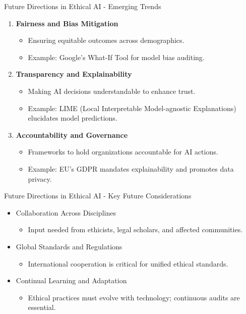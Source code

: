 \documentclass[aspectratio=169]{beamer}
\begin{document}
\begin{frame}[fragile]{Future Directions in Ethical AI - Emerging Trends}
    \begin{enumerate}
        \item \textbf{Fairness and Bias Mitigation}
            \begin{itemize}
                \item Ensuring equitable outcomes across demographics.
                \item Example: Google's What-If Tool for model bias auditing.
            \end{itemize}
        
        \item \textbf{Transparency and Explainability}
            \begin{itemize}
                \item Making AI decisions understandable to enhance trust.
                \item Example: LIME (Local Interpretable Model-agnostic Explanations) elucidates model predictions.
            \end{itemize}
        
        \item \textbf{Accountability and Governance}
            \begin{itemize}
                \item Frameworks to hold organizations accountable for AI actions.
                \item Example: EU's GDPR mandates explainability and promotes data privacy.
            \end{itemize}
    \end{enumerate}
\end{frame}

\begin{frame}[fragile]{Future Directions in Ethical AI - Key Future Considerations}
    \begin{itemize}
        \item Collaboration Across Disciplines
            \begin{itemize}
                \item Input needed from ethicists, legal scholars, and affected communities.
            \end{itemize}
        
        \item Global Standards and Regulations
            \begin{itemize}
                \item International cooperation is critical for unified ethical standards.
            \end{itemize}
        
        \item Continual Learning and Adaptation
            \begin{itemize}
                \item Ethical practices must evolve with technology; continuous audits are essential.
            \end{itemize}
    \end{itemize}
\end{frame}
\end{document}
